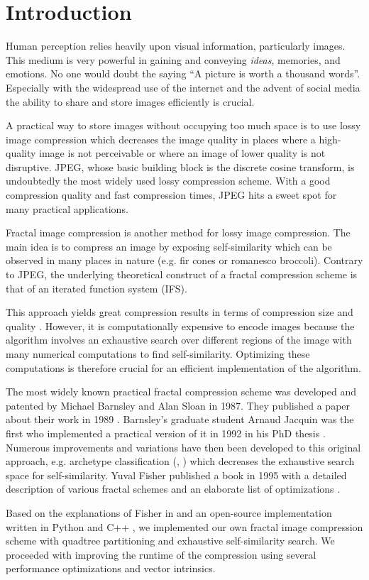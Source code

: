 \section{Introduction}\label{sec:intro}

Human perception relies heavily upon visual information, particularly images.
This medium is very powerful in gaining and conveying \textit{ideas}, memories,
and emotions. No one would doubt the saying ``A picture is worth a thousand
words''. Especially with the widespread use of the internet and the advent of
social media the ability to share and store images efficiently is crucial.

A practical way to store images without occupying too much space is to use lossy
image compression which decreases the image quality in places where a
high-quality image is not perceivable or where an image of lower quality is not
disruptive. JPEG, whose basic building block is the discrete cosine transform,
is undoubtedly the most widely used lossy compression scheme. With a good
compression quality and fast compression times, JPEG hits a sweet spot for many
practical applications.

Fractal image compression is another method for lossy image compression. The
main idea is to compress an image by exposing self-similarity which can be
observed in many places in nature (e.g. fir cones or romanesco broccoli).
Contrary to JPEG, the underlying theoretical construct of a fractal compression
scheme is that of an iterated function system (IFS).

This approach yields great
compression results in terms of compression size and quality \cite{fisher2012}.
However, it is computationally expensive to encode images because the algorithm
involves an exhaustive search over different regions of the image with many
numerical computations to find self-similarity. Optimizing these computations is
therefore crucial for an efficient implementation of the algorithm.

 The most widely known practical fractal compression scheme
was developed and patented by Michael Barnsley and Alan Sloan in 1987. They
published a paper about their work in 1989 \cite{barnsley1989fractal}. Barnsley's
graduate student Arnaud Jacquin was the first who implemented a practical
version of it in 1992 in his PhD thesis \cite{jacquin1990fractal}. Numerous
improvements and variations have then been developed to this original approach,
e.g. archetype classification (\cite{jacobs1992image}, \cite{boss1991studies})
which decreases the exhaustive search space for self-similarity. Yuval Fisher
published a book in 1995 with a detailed description of various fractal schemes
and an elaborate list of optimizations \cite{fisher2012}.

 Based on the explanations of Fisher in \cite{fisher2012}
and an open-source implementation written in Python \cite{github-python} and C++
\cite{github-cpp}, we implemented our own fractal image compression scheme with
quadtree partitioning and exhaustive self-similarity search. We proceeded with
improving the runtime of the compression using several performance optimizations
and vector intrinsics.
